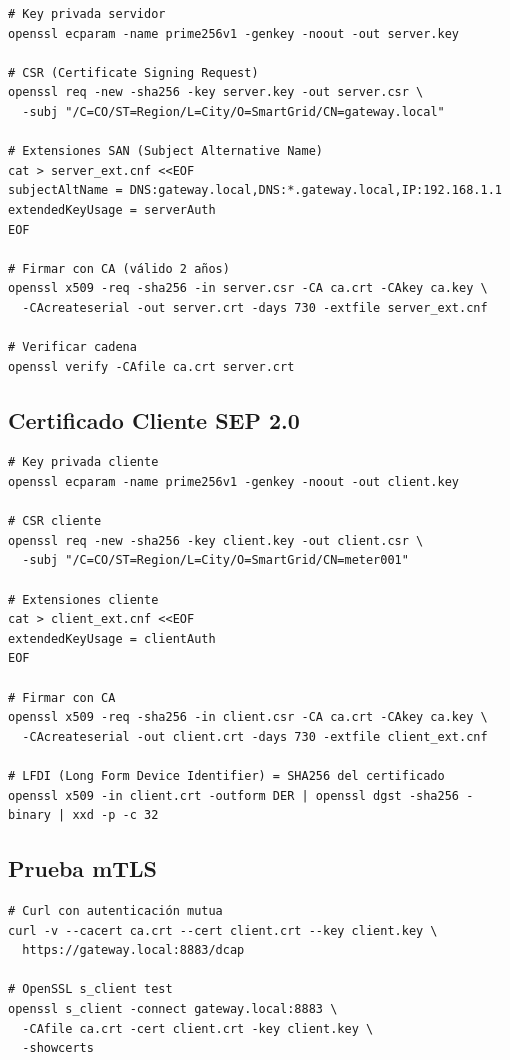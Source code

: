 \begin{verbatim}
# Key privada servidor
openssl ecparam -name prime256v1 -genkey -noout -out server.key

# CSR (Certificate Signing Request)
openssl req -new -sha256 -key server.key -out server.csr \
  -subj "/C=CO/ST=Region/L=City/O=SmartGrid/CN=gateway.local"

# Extensiones SAN (Subject Alternative Name)
cat > server_ext.cnf <<EOF
subjectAltName = DNS:gateway.local,DNS:*.gateway.local,IP:192.168.1.1
extendedKeyUsage = serverAuth
EOF

# Firmar con CA (válido 2 años)
openssl x509 -req -sha256 -in server.csr -CA ca.crt -CAkey ca.key \
  -CAcreateserial -out server.crt -days 730 -extfile server_ext.cnf

# Verificar cadena
openssl verify -CAfile ca.crt server.crt
\end{verbatim}

\subsection{Certificado Cliente SEP 2.0}

\begin{verbatim}
# Key privada cliente
openssl ecparam -name prime256v1 -genkey -noout -out client.key

# CSR cliente
openssl req -new -sha256 -key client.key -out client.csr \
  -subj "/C=CO/ST=Region/L=City/O=SmartGrid/CN=meter001"

# Extensiones cliente
cat > client_ext.cnf <<EOF
extendedKeyUsage = clientAuth
EOF

# Firmar con CA
openssl x509 -req -sha256 -in client.csr -CA ca.crt -CAkey ca.key \
  -CAcreateserial -out client.crt -days 730 -extfile client_ext.cnf

# LFDI (Long Form Device Identifier) = SHA256 del certificado
openssl x509 -in client.crt -outform DER | openssl dgst -sha256 -binary | xxd -p -c 32
\end{verbatim}

\subsection{Prueba mTLS}

\begin{verbatim}
# Curl con autenticación mutua
curl -v --cacert ca.crt --cert client.crt --key client.key \
  https://gateway.local:8883/dcap

# OpenSSL s_client test
openssl s_client -connect gateway.local:8883 \
  -CAfile ca.crt -cert client.crt -key client.key \
  -showcerts
\end{verbatim}

